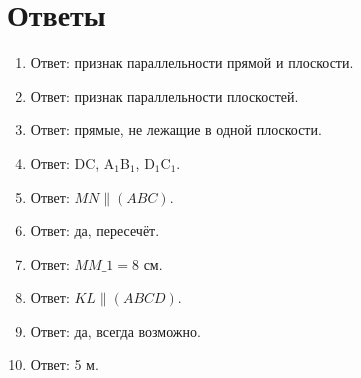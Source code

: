 \documentclass{umk-matematika}
\begin{document}
\section*{Ответы}

\begin{enumerate}
  \item Ответ: признак параллельности прямой и плоскости.
  \item Ответ: признак параллельности плоскостей.
  \item Ответ: прямые, не лежащие в одной плоскости.
  \item Ответ: DC, A$_1$B$_1$, D$_1$C$_1$.
  \item Ответ: $MN \parallel (ABC)$.
  \item Ответ: да, пересечёт.
  \item Ответ: $MM\_1 = 8$ см.
  \item Ответ: $KL \parallel (ABCD)$.
  \item Ответ: да, всегда возможно.
  \item Ответ: 5 м.
\end{enumerate}
\end{document}

